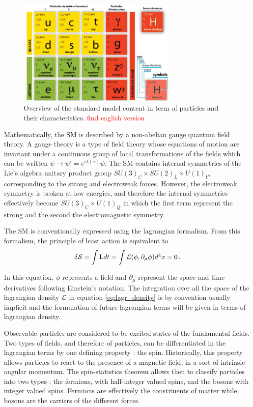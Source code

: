 \begin{figure}
    \centering
    \includegraphics[width=0.7\textwidth]{Images/modele_standard.jpeg}
    \caption{Overview of the standard model content in term of particles and their characteristics. \textcolor{red}{find english version}}
    \label{fig:SM}
\end{figure}

Mathematically, the SM is described by a non-abelian gauge quantum field theory. A gauge theory is a type of field theory whose equations of motion are invariant under a continuous group of local transformations of the fields which can be written $\psi \rightarrow \psi' = e^{i\lambda(x)}\psi$. The SM contains internal symmetries of the Lie's algebra unitary product group $SU(3)_C \times SU(2)_L \times U(1)_Y$, corresponding to the strong and electroweak forces. However, the electroweak symmetry is broken at low energies, and therefore the internal symmetries effectively become $SU(3)_C \times U(1)_Q$ in which the first term represent the strong and the second the electromagnetic symmetry.

The SM is conventionally expressed using the lagrangian formalism. From this formalism, the principle of least action is equivalent to \cite{Thomson:2013zua}
\begin{equation}
    \delta \mathcal{S} = \int \mathrm{L} dt = \int \Lagr(\phi,\partial_{\mu}\phi) d^4 x = 0 \mend
    \label{eq:lagr_density}
\end{equation}

In this equation, $\phi$ represents a field and $\partial_{\mu}$ represent the space and time derivatives following Einstein's notation. The integration over all the space of the lagrangian density $\mathcal{L}$ in equation \ref{eq:lagr_density} is by convention usually implicit and the formulation of future lagrangian terms will be given in terms of lagrangian density.

Observable particles are considered to be excited states of the fundamental fields. Two types of fields, and therefore of particles, can be differentiated in the lagrangian terms by one defining property : the spin. Historically, this property allows particles to react to the presence of a magnetic field, in a sort of intrinsic angular momentum. The spin-statistics theorem allows then to classify particles into two types : the fermions, with half-integer valued spins, and the bosons with integer valued spins. Fermions are effectively the constituents of matter while bosons are the carriers of the different forces.

